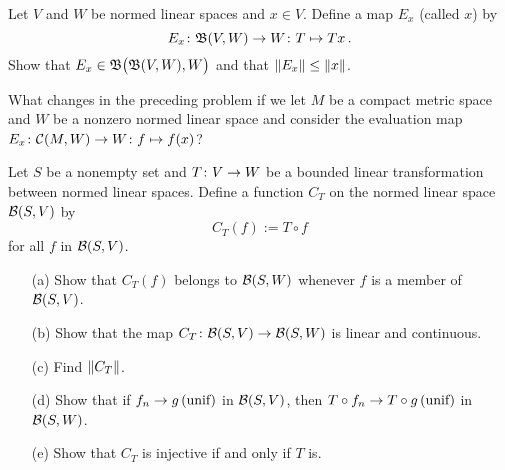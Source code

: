 \begin{prob}\label{prob_eval_op} Let $V$ and $W$ be normed linear spaces and $x \in V$.
Define a map $E_x$ (called
 $x$) by
  \[ E_x\colon \mathfrak{B}(V,W) \rightarrow W\colon T \mapsto Tx\,. \]
Show that $E_x \in \mathfrak{B}\bigl(\mathfrak{B}(V,W),W\bigr)$ and that $\lVert E_x\rVert \le \lVert x\rVert$.
\end{prob}

\begin{prob}\label{prob_Ex_cms}  What changes in the preceding problem if we let $M$ be a
compact metric space and $W$ be a nonzero normed linear space and consider the evaluation map
$E_x \colon \mathcal{C}(M,W) \rightarrow W \colon f \mapsto f(x)$?
\end{prob}

\begin{prob}\label{prob_comp_op} Let $S$ be a nonempty set and $T \colon V \rightarrow W$ be a bounded
linear transformation between normed linear spaces.  Define a function $C_T$ on the normed
linear space $\mathcal{B}(S,V)$ by
  \[ C_T(f) :=  T \circ f \]
for all $f$ in $\mathcal{B}(S,V)$.
 \begin{enumerate}
  \item[(a)] Show that $C_T(f)$ belongs to $\mathcal{B}(S,W)$ whenever $f$ is a member of
$\mathcal{B}(S,V)$.
  \item[(b)] Show that the map $C_T\colon \mathcal{B}(S,V) \rightarrow \mathcal{B}(S,W)$ is linear and
continuous.
  \item[(c)] Find $\lVert C_T\rVert$.
  \item[(d)] Show that if $f_n \rightarrow g \text{\,(unif)}$ in $\mathcal{B}(S,V)$, then
$T \circ f_n \rightarrow T \circ g \text{\,(unif)}$ in $\mathcal{B}(S,W)$.
  \item[(e)] Show that $C_T$ is injective if and only if $T$ is.
 \end{enumerate}
\end{prob}

